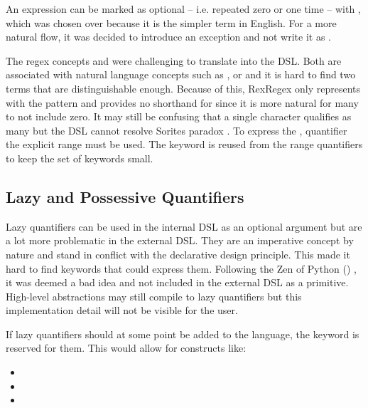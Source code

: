 An expression can be marked as optional -- i.e. repeated zero or one time -- with , which was chosen over  because it is the simpler term in English. For a more natural flow, it was decided to introduce an exception and not write it as .

The regex concepts \pattern{\placeholder *} and \pattern{\placeholder +} were challenging to translate into the DSL. Both are associated with natural language concepts such as ,  or  and it is hard to find two terms that are distinguishable enough. Because of this, RexRegex only represents \pattern{+} with the  pattern and provides no shorthand for \pattern{*} since it is more natural for many to not include zero. It may still be confusing that a single character qualifies as many but the DSL cannot resolve Sorites paradox \cite{SoritesParadox}. To express the \pattern{*}, quantifier the explicit range  must be used. The  keyword is reused from the range quantifiers to keep the set of keywords small.

\subsection{Lazy and Possessive Quantifiers}

Lazy quantifiers can be used in the internal DSL as an optional argument  but are a lot more problematic in the external DSL. They are an imperative concept by nature and stand in conflict with the declarative design principle. This made it hard to find keywords that could express them. Following the Zen of Python () , it was deemed a bad idea and not included in the external DSL as a primitive. High-level abstractions may still compile to lazy quantifiers but this implementation detail will not be visible for the user.

If lazy quantifiers should at some point be added to the language, the  keyword is reserved for them. This would allow for constructs like: 

\begin{itemize}
    \setlength\itemsep{0em}
    \item {}
    \item {} 
    \item {} 
\end{itemize}



